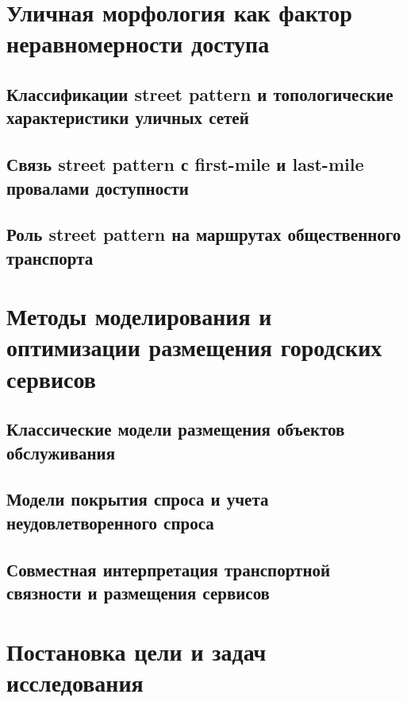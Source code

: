\section{Уличная морфология как фактор неравномерности доступа}
\label{sec:street-pattern-factor}

\subsection{Классификации street pattern и топологические характеристики уличных сетей}
\label{subsec:street-pattern-taxonomy}

\subsection{Связь street pattern с first-mile и last-mile провалами доступности}
\label{subsec:street-pattern-walk-failures}

\subsection{Роль street pattern на маршрутах общественного транспорта}
\label{subsec:street-pattern-pt-paths}

\section{Методы моделирования и оптимизации размещения городских сервисов}
\label{sec:service-placement-review}

\subsection{Классические модели размещения объектов обслуживания}
\label{subsec:classical-flp}

\subsection{Модели покрытия спроса и учета неудовлетворенного спроса}
\label{subsec:coverage-demand}

\subsection{Совместная интерпретация транспортной связности и размещения сервисов}
\label{subsec:transport-service-joint}

\section{Постановка цели и задач исследования}
\label{sec:research-goal-tasks}

